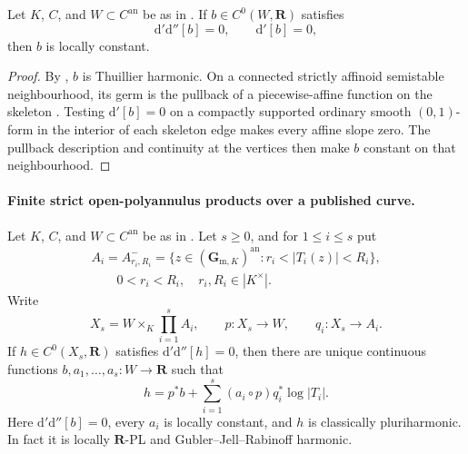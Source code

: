 \begin{lemma}
\label{lem:p062-curve-first-current-rigidity}
Let \(K\), \(C\), and \(W\subset C^{\mathrm{an}}\) be as in
.  If \(b\in C^0(W,\mathbf R)\) satisfies
\[
          \mathrm d'\mathrm d''[b]=0,\qquad \mathrm d'[b]=0,
\]
then \(b\) is locally constant.
\end{lemma}

\begin{proof}
By , \(b\) is Thuillier
harmonic.  On a connected strictly affinoid semistable neighbourhood, its
germ is the pullback of a piecewise-affine function on the skeleton
\cite[Definition~2.3.1 and Definition~2.3.16]{Thu05}.  Testing
\(\mathrm d'[b]=0\) on a compactly supported ordinary smooth
\((0,1)\)-form in the interior of each skeleton edge makes every affine
slope zero.  The pullback description and continuity at the vertices then
make \(b\) constant on that neighbourhood.
\end{proof}

\paragraph{Finite strict open-polyannulus products over a published curve.}
\begin{theorem}
\label{thm:p062-open-polyannulus-products-over-curves}
Let \(K\), \(C\), and \(W\subset C^{\mathrm{an}}\) be as in
.  Let \(s\geq0\), and for
\(1\leq i\leq s\) put
\[
 \begin{gathered}
 A_i=A^-_{r_i,R_i}
 =\{z\in(\mathbf G_{\mathrm m,K})^{\mathrm{an}}:
                  r_i<|T_i(z)|<R_i\},\\
 \qquad 0<r_i<R_i,\quad r_i,R_i\in|K^\times|.
 \end{gathered}
\]
Write
\[
 X_s=W\times_K\prod_{i=1}^sA_i,
 \qquad p:X_s\longrightarrow W,
 \qquad q_i:X_s\longrightarrow A_i.
\]
If \(h\in C^0(X_s,\mathbf R)\) satisfies
\(\mathrm d'\mathrm d''[h]=0\), then there are unique continuous functions
\(b,a_1,\ldots,a_s:W\to\mathbf R\) such that
\[
 h=p^*b+\sum_{i=1}^s(a_i\circ p)q_i^*\log|T_i|.
\tag{\(\heartsuit\)}\label{eq:p062-open-polyannulus-curve-formula}
\]
Here \(\mathrm d'\mathrm d''[b]=0\), every \(a_i\) is locally constant,
and \(h\) is classically pluriharmonic.  In fact it is locally
\(\mathbf R\)-PL and Gubler--Jell--Rabinoff harmonic.
\end{theorem}

